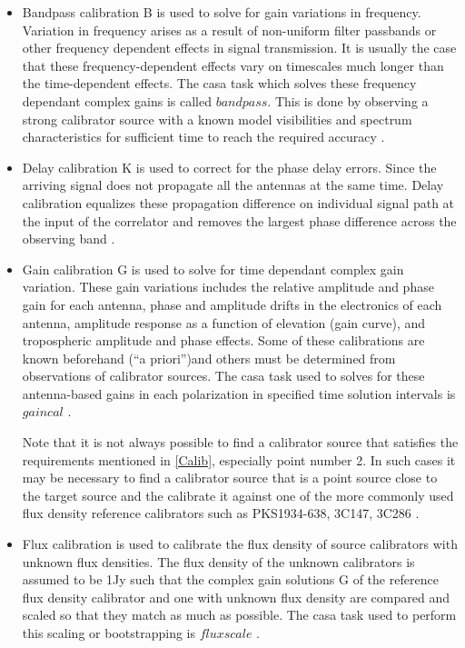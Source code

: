 \begin{itemize}

\item Bandpass calibration B is used to solve for gain variations
in frequency. Variation in frequency arises as a result of non-uniform filter passbands or other frequency dependent effects in signal transmission. It is usually the case that these frequency-dependent effects vary on timescales much longer than the time-dependent effects. The casa task which solves these frequency dependant complex gains is called $\textit{bandpass}$. This is done by observing a strong calibrator source with a known model visibilities and spectrum characteristics for sufficient time to reach the required accuracy \citep{taylor1999synthesis}.

\item Delay calibration K is used to correct for the phase delay errors. Since the arriving signal does not propagate all the antennas at the same time. Delay calibration equalizes these propagation difference on individual signal path at the input of the correlator and removes the largest phase difference across the observing band \citep{taylor1999synthesis}.   

\item Gain calibration G is used to solve for time dependant complex gain variation. These gain variations includes the relative amplitude and phase gain for each antenna, phase and amplitude drifts in the electronics of each antenna, amplitude response as a function of elevation (gain curve), and tropospheric amplitude and phase effects. Some of these calibrations are known beforehand (“a priori”)and others must be determined from observations of calibrator sources. The casa task used to solves for these antenna-based gains in each polarization in specified time solution intervals  is $\textit{gaincal}$ \citep{editioncasa}.  

Note that it is not always possible to find a calibrator source that satisfies the requirements mentioned in \ref{Calib}, especially point number 2. In such cases it may be necessary to find a calibrator source that is a point source  close to the target source and the calibrate it against one of the more commonly used flux density reference calibrators such as PKS1934-638, 3C147, 3C286 \citep{thompson2001interferometry}. 

\item Flux calibration is used to calibrate the flux density of source calibrators with unknown flux densities. The flux density of the unknown calibrators is assumed to be 1Jy such that the complex gain solutions G of the reference flux density calibrator and one with unknown flux density are compared and scaled so that they match as much as possible. The casa task used to perform this scaling or bootstrapping is $\textit{fluxscale}$ \citep{editioncasa}.
\end{itemize}

